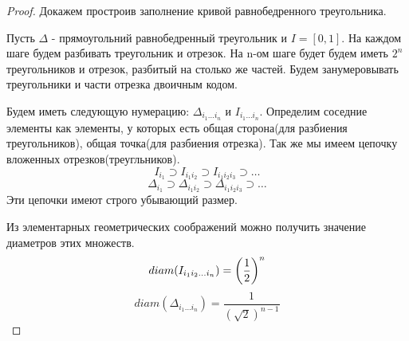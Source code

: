 \begin{proof}
    Докажем простроив заполнение кривой равнобедренного треугольника.

    \begin{center}
        

    \end{center}
    

    Пусть $\Delta$ - прямоугольний равнобедренный треугольник и $I = [0,1]$. На каждом шаге будем разбивать треугольник и отрезок. На n-ом шаге будет будем иметь $2^n$ треугольников и отрезок, разбитый на столько же частей. Будем занумеровывать треугольники и части отрезка двоичным кодом.
    
    Будем иметь следующую нумерацию: $\Delta_{i_1 \ldots i_n}$ и $I_{i_1 \ldots i_n}$. Определим соседние элементы как элементы, у которых есть общая сторона(для разбиения треугольников), общая точка(для разбиения отрезка).
    Так же мы имеем цепочку вложенных отрезков(треугльников).
    \[
        I_{i_1} \supset I_{i_1 i_2} \supset I_{i_1 i_2 i_3} \supset \ldots
    \]
    \[
        \Delta_{i_1} \supset \Delta_{i_1 i_2} \supset \Delta_{i_1 i_2 i_3} \supset \ldots
    \]
    Эти цепочки имеют строго убывающий размер.

    Из элементарных геометрических соображений можно получить значение диаметров этих множеств.
    \[
        diam(I_{i_1 i_2 \ldots i_n}) = \left(\frac{1}{2}\right)^n
    \]
    \[
        diam(\Delta_{i_1 \ldots i_n}) = \frac{1}{(\sqrt{2})^{n - 1}}
    \]


\end{proof}
